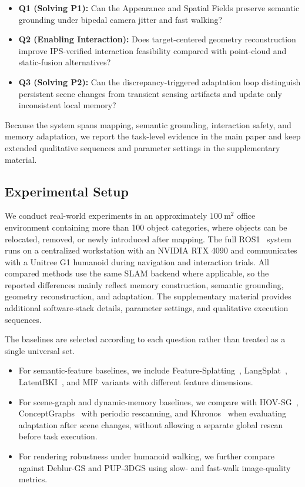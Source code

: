 \documentclass[conference]{IEEEtran}
\begin{document}
\begin{itemize}
    \item \textbf{Q1 (Solving P1):} Can the Appearance and Spatial Fields preserve semantic grounding under bipedal camera jitter and fast walking?
    \item \textbf{Q2 (Enabling Interaction):} Does target-centered geometry reconstruction improve IPS-verified interaction feasibility compared with point-cloud and static-fusion alternatives?
    \item \textbf{Q3 (Solving P2):} Can the discrepancy-triggered adaptation loop distinguish persistent scene changes from transient sensing artifacts and update only inconsistent local memory?
\end{itemize}

Because the system spans mapping, semantic grounding, interaction safety, and memory adaptation, we report the task-level evidence in the main paper and keep extended qualitative sequences and parameter settings in the supplementary material.

\subsection{Experimental Setup}
%
We conduct real-world experiments in an approximately $100~\text{m}^2$ office environment containing more than 100 object categories, where objects can be relocated, removed, or newly introduced after mapping.
%
The full ROS1~\cite{quigley2009ros} system runs on a centralized workstation with an NVIDIA RTX 4090 and communicates with a Unitree G1 humanoid during navigation and interaction trials.
%
All compared methods use the same SLAM backend where applicable, so the reported differences mainly reflect memory construction, semantic grounding, geometry reconstruction, and adaptation.
%
The supplementary material provides additional software-stack details, parameter settings, and qualitative execution sequences.


The baselines are selected according to each question rather than treated as a single universal set.
\begin{itemize}
    \item For semantic-feature baselines, we include Feature-Splatting~\cite{qiu2024featuresplatting}, LangSplat~\cite{qin2024langsplat}, LatentBKI~\cite{wilson2025latentbki}, and MIF variants with different feature dimensions.
    \item For scene-graph and dynamic-memory baselines, we compare with HOV-SG~\cite{Werby-RSS-24}, ConceptGraphs~\cite{gu2024conceptgraphs} with periodic rescanning, and Khronos~\cite{schmid2024khronos} when evaluating adaptation after scene changes, without allowing a separate global rescan before task execution.
    \item For rendering robustness under humanoid walking, we further compare against Deblur-GS and PUP-3DGS using slow- and fast-walk image-quality metrics.
\end{itemize}
\end{document}
